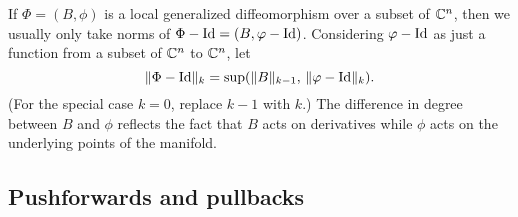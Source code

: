 \documentclass{article}
\begin{document}
\begin{defn}
If $\Phi = (B,\phi)$ is a local generalized diffeomorphism over a subset of $\mathbb C^n$, then we usually only take norms of $\Phi - \textrm{Id} = (B,\varphi-\textrm{Id})$.  Considering $\varphi-\textrm{Id}$ as just a function from a subset of $\mathbb C^n$ to $\mathbb C^n$, let
\begin{equation}
\|\Phi-\textrm{Id}\|_k = \sup(\|B\|_{k-1},\,\|\varphi-\textrm{Id}\|_k).
\end{equation}
(For the special case $k=0$, replace $k-1$ with $k$.) The difference in degree between $B$ and $\phi$ reflects the fact that $B$ acts on derivatives while $\phi$ acts on the underlying points of the manifold.
\end{defn}


\subsection{Pushforwards and pullbacks}\label{pushforwards and pullbacks}
\end{document}
